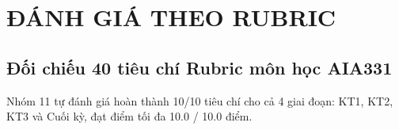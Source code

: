 \chapter{ĐÁNH GIÁ THEO RUBRIC}
\label{ch:14}

\section{Đối chiếu 40 tiêu chí Rubric môn học AIA331}
Nhóm 11 tự đánh giá hoàn thành 10/10 tiêu chí cho cả 4 giai đoạn: KT1, KT2, KT3 và Cuối kỳ, đạt điểm tối đa 10.0 / 10.0 điểm.

